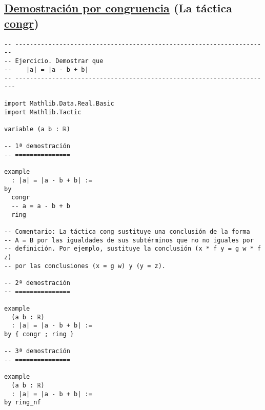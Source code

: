 \subsection{\href{./src/Logica/Demostracion\_por\_congruencia.lean}{Demostración por congruencia} (La táctica \href{https://bit.ly/2BfOZqV}{congr})}
\label{sec:orgf0e9450}
\begin{verbatim}
-- ---------------------------------------------------------------------
-- Ejercicio. Demostrar que
--    |a| = |a - b + b|
-- ----------------------------------------------------------------------

import Mathlib.Data.Real.Basic
import Mathlib.Tactic

variable (a b : ℝ)

-- 1ª demostración
-- ===============

example
  : |a| = |a - b + b| :=
by
  congr
  -- a = a - b + b
  ring

-- Comentario: La táctica cong sustituye una conclusión de la forma
-- A = B por las igualdades de sus subtérminos que no no iguales por
-- definición. Por ejemplo, sustituye la conclusión (x * f y = g w * f z)
-- por las conclusiones (x = g w) y (y = z).

-- 2ª demostración
-- ===============

example
  (a b : ℝ)
  : |a| = |a - b + b| :=
by { congr ; ring }

-- 3ª demostración
-- ===============

example
  (a b : ℝ)
  : |a| = |a - b + b| :=
by ring_nf
\end{verbatim}

